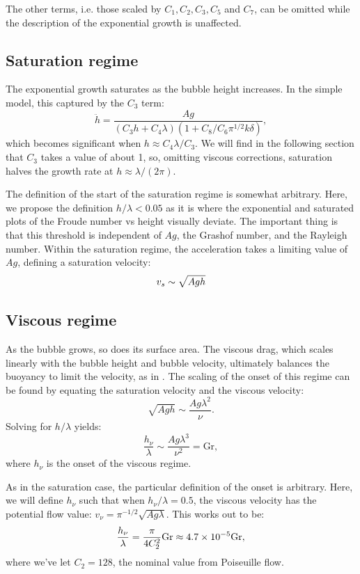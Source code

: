 The other terms, i.e. those scaled by $C_1, C_2, C_3, C_5$ and $C_7$, can be omitted while the description of the exponential growth is unaffected.

\subsection{Saturation regime}
The exponential growth saturates as the bubble height increases.
In the simple model, this captured by the $C_3$ term:
\begin{equation}
\ddot{h} = \frac{A g}{(C_3 h + C_4 \lambda) (1 + C_8 / C_6 \pi^{1/2} k \delta)},
\end{equation}
which becomes significant when $h \approx C_4 \lambda / C_3$.
We will find in the following section that $C_3$ takes a value of about 1, so, omitting viscous corrections, saturation halves the growth rate at $h \approx \lambda / (2\pi)$.

The definition of the start of the saturation regime is somewhat arbitrary.
Here, we propose the definition $h/\lambda < 0.05$ as it is where the exponential and saturated plots of the Froude number vs height visually deviate.
The important thing is that this threshold is independent of $Ag$, the Grashof number, and the Rayleigh number.
Within the saturation regime, the acceleration takes a limiting value of $Ag$, defining a saturation velocity:
\begin{equation} \elabel{vel_sat}
v_s \sim \sqrt{A g h}
\end{equation}

\subsection{Viscous regime}
As the bubble grows, so does its surface area.
The viscous drag, which scales linearly with the bubble height and bubble velocity, ultimately balances the buoyancy to limit the velocity, as in .
The scaling of the onset of this regime can be found by equating the saturation velocity and the viscous velocity:
\begin{equation}
\sqrt{A g h} \sim \frac{A g \lambda^2}{\nu}.
\end{equation}
Solving for $h/\lambda$ yields:
\begin{equation}
\frac{h_\nu}{\lambda} \sim \frac{A g \lambda^3}{\nu^2} = \text{Gr},
\end{equation}
where $h_\nu$ is the onset of the viscous regime.

As in the saturation case, the particular definition of the onset is arbitrary.
Here, we will define $h_\nu$ such that when $h_\nu/\lambda = 0.5$, the viscous velocity has the potential flow value: $v_\nu = \pi^{-1/2} \sqrt{A g \lambda}$.
This works out to be:
\begin{equation} \elabel{visc_height}
\frac{h_\nu}{\lambda} = \frac{\pi}{4 C_2^2} \text{Gr} \approx 4.7 \times 10^{-5} \text{Gr},
\end{equation}
where we've let $C_2 = 128$, the nominal value from Poiseuille flow.

